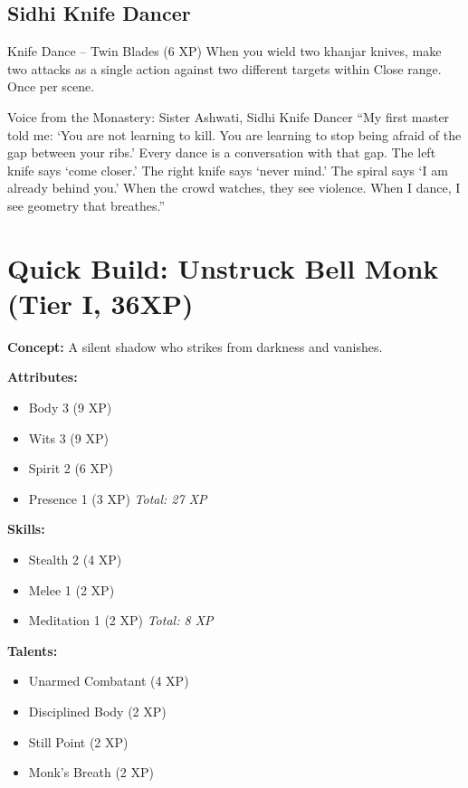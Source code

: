 \documentclass[9pt,a5paper]{extbook}
\begin{document}
\subsection{Sidhi Knife Dancer}

\begin{talentbox}{Knife Dance -- Twin Blades (6 XP)}
When you wield two khanjar knives, make two attacks as a single action against two different targets within Close range. Once per scene.
\end{talentbox}

\begin{warriorbox}{Voice from the Monastery: Sister Ashwati, Sidhi Knife Dancer}
``My first master told me: `You are not learning to kill. You are learning to stop being afraid of the gap between your ribs.' Every dance is a conversation with that gap. The left knife says `come closer.' The right knife says `never mind.' The spiral says `I am already behind you.' When the crowd watches, they see violence. When I dance, I see geometry that breathes.''
\end{warriorbox}

\section{Quick Build: Unstruck Bell Monk (Tier I, 36XP)}

\textbf{Concept:} A silent shadow who strikes from darkness and vanishes.

\noindent
\textbf{Attributes:}
\begin{itemize}
    \item Body 3 (9 XP)
    \item Wits 3 (9 XP)
    \item Spirit 2 (6 XP)
    \item Presence 1 (3 XP) \hfill \textit{Total: 27 XP}
\end{itemize}

\noindent
\textbf{Skills:}
\begin{itemize}
    \item Stealth 2 (4 XP)
    \item Melee 1 (2 XP)
    \item Meditation 1 (2 XP) \hfill \textit{Total: 8 XP}
\end{itemize}

\noindent
\textbf{Talents:}
\begin{itemize}
    \item Unarmed Combatant (4 XP)
    \item Disciplined Body (2 XP)
    \item Still Point (2 XP)
    \item Monk's Breath (2 XP)
\end{itemize}
\end{document}
